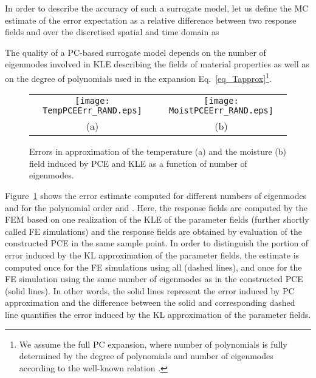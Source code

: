 \documentclass[preprint,12pt]{elsarticle}
\begin{document}
In order to describe the accuracy of such a surrogate model, let
us define the MC estimate of the error expectation
 as a relative difference between two
response fields  and  over the discretised
spatial and time domain as


The quality of a PC-based surrogate model depends on the number
 of eigenmodes involved in KLE describing the fields of
material properties as well as on the degree of polynomials 
used in the expansion Eq.~\eqref{eq_Tapprox}\footnote{We assume
the full PC expansion,
  where number of polynomials  is fully determined by the degree of
  polynomials  and number of eigenmodes  according to the
  well-known relation .}.
\begin{figure} [ht!]
\centering
\begin{tabular}{cc}
\texttt{[image: TempPCEErr\_RAND.eps]}&
\texttt{[image: MoistPCEErr\_RAND.eps]}\\
(a)&(b)
\end{tabular}
\caption{ Errors in approximation of the temperature (a) and the
  moisture (b) field induced by PCE and KLE as a function of number of
  eigenmodes.}
\label{fig_wholeerr}
\end{figure}
Figure~\ref{fig_wholeerr} shows the error estimate
 computed for different numbers of
eigenmodes  and for the polynomial order  and . Here,
the response fields  are
  computed by the FEM based on one realization of the KLE of the
  parameter fields (further shortly called FE simulations) and the
  response fields  are obtained by evaluation of the
  constructed PCE in the same sample point. In order to distinguish
  the portion of error induced by the KL approximation of the parameter
  fields, the estimate  is computed once for the FE
  simulations using all  (dashed lines), and once for the FE
  simulation using the same number of eigenmodes as in the constructed
  PCE (solid lines). In other words, the solid lines represent the
error induced by PC approximation and the difference between the
solid and corresponding dashed line quantifies the error induced
by the KL approximation of the parameter fields.
\end{document}

